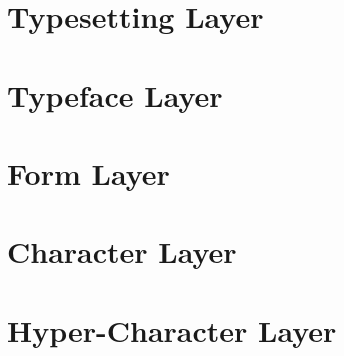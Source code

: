 \documentclass{beamer}
\begin{document}
    \section{Typesetting Layer}

    \section{Typeface Layer}

    \section{Form Layer}

    \section{Character Layer}

    \section{Hyper-Character Layer}
\end{document}
